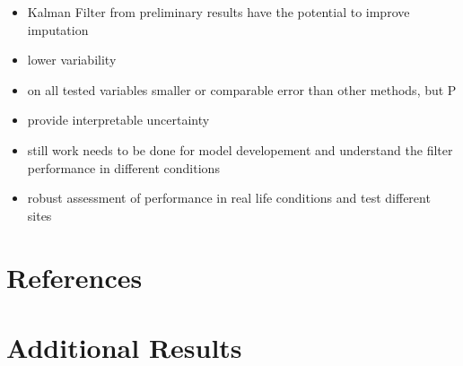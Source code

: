 \documentclass{article}
\let\Oldsection\section
\renewcommand{\section}{\FloatBarrier\Oldsection}
\begin{document}
\begin{itemize}
    \item Kalman Filter from preliminary results have the potential to improve imputation
    \item lower variability 
    \item on all tested variables smaller or comparable error than other methods, but P
    \item provide interpretable uncertainty
    \item still work needs to be done for model developement and understand the filter performance in different conditions
    \item robust assessment of performance in real life conditions and test different sites
\end{itemize}

\section*{References}

\printbibliography

\appendix

\FloatBarrier


\section{Additional Results}
\end{document}
